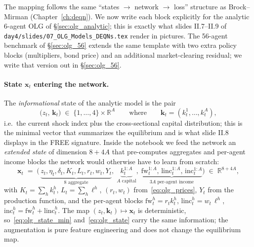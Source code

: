 \documentclass[11pt,a4paper]{report}
\newcommand{\x}{\bm{x}}
\newcommand{\R}{\mathbb{R}}
\begin{document}
The mapping follows the same ``states $\to$ network $\to$ loss'' structure as Brock--Mirman (Chapter~\ref{ch:deqn}).  We now write each block explicitly for the analytic 6-agent OLG of \S\ref{sec:olg_analytic}; this is exactly what slides II.7--II.9 of \texttt{day4/slides/07\_OLG\_Models\_DEQNs.tex} render in pictures.  The 56-agent benchmark of \S\ref{sec:olg_56} extends the same template with two extra policy blocks (multipliers, bond price) and an additional market-clearing residual; we write that version out in \S\ref{sec:olg_56}.

\paragraph{State $\x_t$ entering the network.}
The \emph{informational} state of the analytic model is the pair
\begin{equation}
\bigl(z_t,\,\bm{k}_t\bigr) \;\in\; \{1,\ldots,4\}\times\R^A
\qquad\text{where}\qquad \bm{k}_t = (k_t^1,\ldots,k_t^A),
\label{eq:olg_state_min}
\end{equation}
i.e.\ the current shock index plus the cross-sectional capital distribution; this is the minimal vector that summarizes the equilibrium and is what slide II.8 displays in the FREE signature.  Inside the notebook we feed the network an \emph{extended state} of dimension $8+4A$ that pre-computes aggregates and per-agent income blocks the network would otherwise have to learn from scratch:
\begin{equation}
\x_t \;=\; \bigl(\,\underbrace{z_t,\eta_t,\delta_t,K_t,L_t,r_t,w_t,Y_t}_{8\text{ aggregate}},\;
\underbrace{k_t^{1:A}}_{A\text{ capital}},\;
\underbrace{\mathrm{fw}_t^{1:A},\,\mathrm{linc}_t^{1:A},\,\mathrm{inc}_t^{1:A}}_{3A\text{ per-agent income}}\bigr) \;\in\; \R^{8+4A},
\label{eq:olg_state}
\end{equation}
with $K_t=\sum_h k_t^h$, $L_t=\sum_h \ell^h$, $(r_t,w_t)$ from~\eqref{eq:olg_prices}, $Y_t$ from the production function, and the per-agent blocks $\mathrm{fw}_t^h = r_t k_t^h$, $\mathrm{linc}_t^h = w_t\,\ell^h$, $\mathrm{inc}_t^h = \mathrm{fw}_t^h + \mathrm{linc}_t^h$.  The map $(z_t,\bm{k}_t)\mapsto\x_t$ is deterministic, so~\eqref{eq:olg_state_min} and~\eqref{eq:olg_state} carry the same information; the augmentation is pure feature engineering and does not change the equilibrium map.
\end{document}
